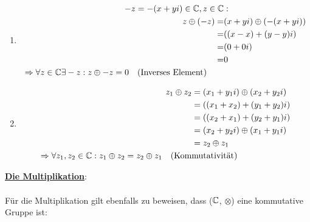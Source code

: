 \documentclass[main.tex]{subfiles}
\begin{document}
\begin{Beweis}
\begin{enumerate}[1)]
			\item \begin{align*}
	  					-z = -(x + yi) \in \mathbb{C}, z \in \mathbb{C} &: \\
								  z \oplus (-z) =& (x + yi) \oplus (-(x + yi)) \\
								  			  =& ((x - x) + (y - y)i) \\
											  =& (0 + 0i) \\
											  =& 0  \\
						\Rightarrow \forall z \in \mathbb{C} \exists -z: z \oplus -z = 0 \quad \text{(Inverses Element)} \qquad &
	  			  \end{align*}
			\item \begin{align*}
						z_1 \oplus z_2 &= (x_1 + y_1i) \oplus (x_2 + y_2i) \\
									   &= ((x_1 + x_2) + (y_1 + y_2)i) \\
									   &= ((x_2 + x_1) + (y_2 + y_1)i) \\
									   &= (x_2 + y_2i) \oplus (x_1 + y_1i) \\
									   &= z_2 \oplus z_1 \\
						\Rightarrow \forall z_1, z_2 \in \mathbb{C}: z_1 \oplus z_2 = z_2 \oplus z_1 \quad \text{(Kom}&\text{mutativität)}
				  \end{align*}
		\end{enumerate}
		\newpage
		\underline{\textbf{Die Multiplikation}}:

		\paragraph{} Für die Multiplikation gilt ebenfalls zu beweisen, dass ($\mathbb{C}$, $\otimes$) eine kommutative Gruppe ist:


\end{Beweis}
\end{document}

